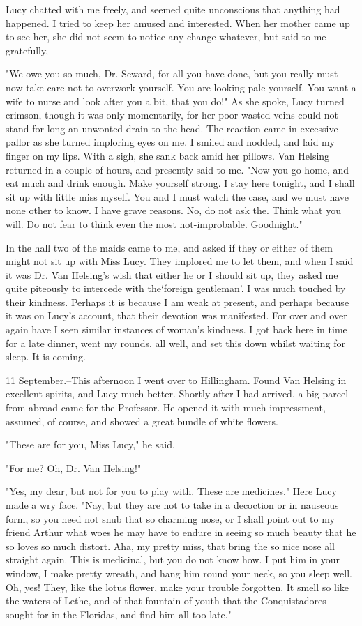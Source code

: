 Lucy chatted with me freely, and seemed quite unconscious that anything had happened. I tried to keep her amused and interested. When her mother came up to see her, she did not seem to notice any change whatever, but said to me gratefully, 

"We owe you so much, Dr. Seward, for all you have done, but you really must now take care not to overwork yourself. You are looking pale yourself. You want a wife to nurse and look after you a bit, that you do!" As she spoke, Lucy turned crimson, though it was only momentarily, for her poor wasted veins could not stand for long an unwonted drain to the head. The reaction came in excessive pallor as she turned imploring eyes on me. I smiled and nodded, and laid my finger on my lips. With a sigh, she sank back amid her pillows. Van Helsing returned in a couple of hours, and presently said to me. "Now you go home, and eat much and drink enough. Make yourself strong. I stay here tonight, and I shall sit up with little miss myself. You and I must watch the case, and we must have none other to know. I have grave reasons. No, do not ask the. Think what you will. Do not fear to think even the most not-improbable. Goodnight." 

In the hall two of the maids came to me, and asked if they or either of them might not sit up with Miss Lucy. They implored me to let them, and when I said it was Dr. Van Helsing's wish that either he or I should sit up, they asked me quite piteously to intercede with the`foreign gentleman'. I was much touched by their kindness. Perhaps it is because I am weak at present, and perhaps because it was on Lucy's account, that their devotion was manifested. For over and over again have I seen similar instances of woman's kindness. I got back here in time for a late dinner, went my rounds, all well, and set this down whilst waiting for sleep. It is coming. 

11 September.--This afternoon I went over to Hillingham. Found Van Helsing in excellent spirits, and Lucy much better. Shortly after I had arrived, a big parcel from abroad came for the Professor. He opened it with much impressment, assumed, of course, and showed a great bundle of white flowers. 

"These are for you, Miss Lucy," he said. 

"For me? Oh, Dr. Van Helsing!" 

"Yes, my dear, but not for you to play with. These are medicines." Here Lucy made a wry face. "Nay, but they are not to take in a decoction or in nauseous form, so you need not snub that so charming nose, or I shall point out to my friend Arthur what woes he may have to endure in seeing so much beauty that he so loves so much distort. Aha, my pretty miss, that bring the so nice nose all straight again. This is medicinal, but you do not know how. I put him in your window, I make pretty wreath, and hang him round your neck, so you sleep well. Oh, yes! They, like the lotus flower, make your trouble forgotten. It smell so like the waters of Lethe, and of that fountain of youth that the Conquistadores sought for in the Floridas, and find him all too late." 

